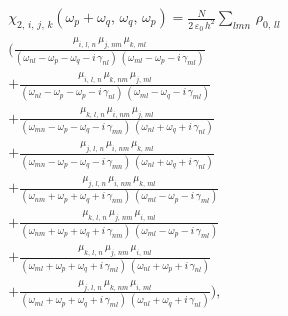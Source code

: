 \documentclass[12pt,twoside,a4paper]{article}
\numberwithin{equation}{subsection}
\numberwithin{figure}{subsection}
\begin{document}
\begin{equation} \label{eq:ssmods_quadratical}
  \begin{split}
    & {\chi_{2, \,i, \,j, \,k}}({\omega_{p}} + {\omega_{q}}, \,{\omega_{q}}, \,{\omega_{p}}) 
      = \frac{N} {2 \, {\varepsilon_0} \, h^{2}} 
        \sum_{lmn} \, {\rho_{0, \,ll}} \, 
 \\ & ( \frac {{\mu_{i, \,l, \,n}} \, {\mu_{j, \,nm}} \, {\mu_{k, \,ml}}} 
              {({\omega_{nl}} - {\omega_{p}} - {\omega_{q}} - i\,{\gamma_{nl}}) \,
               ({\omega_{ml}} - {\omega_{p}} - i\,{\gamma_{ml}}) } 
 \\ & + \frac {{\mu_{i, \,l, \,n}}\,{\mu_{k, \,nm}}\,{\mu_{j, \,ml}}}
              {({\omega_{nl}} - {\omega_{p}} - {\omega_{p}} - i\,{\gamma_{nl}}) \,
               ({\omega_{ml}} - {\omega_{q}} - i\,{\gamma_{ml}})} 
 \\ & + \frac {{\mu_{k, \,l, \,n}}\,{\mu_{i, \,nm}}\,{\mu_{j,\,ml}}}
              {({\omega_{mn}} - {\omega_{p}} - {\omega_{q}} - i\,{\gamma_{mn}}) \,
               ({\omega_{nl}} + {\omega_{q}} + i\,{\gamma_{nl}})}
 \\ & + \frac {{\mu_{j, \,l, \,n}}\,{\mu_{i, \,nm}}\,{\mu_{k, \,ml}}}
              {({\omega_{mn}} - {\omega_{p}} - {\omega_{q}} - i\,{\gamma_{mn}}) \,
               ({\omega_{nl}} + {\omega_{q}} + i\,{\gamma_{nl}})}
 \\ & + \frac {{\mu_{j, \,l, \,n}}\,{\mu_{i, \,nm}}\,{\mu_{k,\,ml}}}
              {({\omega_{nm}} + {\omega_{p}} + {\omega_{q}} + i\,{\gamma_{nm}}) \,
               ({\omega_{ml}} - {\omega_{p}} - i\,{\gamma_{ml}})}
 \\ & + \frac {{\mu_{k, \,l, \,n}}\,{\mu_{j, \,nm}}\,{\mu_{i, \,ml}}}
              {({\omega_{nm}} + {\omega_{p}} + {\omega_{q}} + i\,{\gamma_{nm}}) \,
               ({\omega_{ml}} - {\omega_{p}} - i\,{\gamma_{ml}})} 
 \\ & + \frac {{\mu_{k, \,l, \,n}}\,{\mu_{j, \,nm}}\,{\mu_{i, \,ml}}}
              {({\omega_{ml}} + {\omega_{p}} + {\omega_{q}} + i\,{\gamma_{ml}}) \,
               ({\omega_{nl}} + {\omega_{p}} + i\,{\gamma_{nl}})}
 \\ & + \frac {{\mu_{j, \,l, \,n}}\,{\mu_{k, \,nm}}\,{\mu_{i, \,ml}}}
              {({\omega_{ml}} + {\omega_{p}} + {\omega_{q}} + i\,{\gamma_{ml}}) \,
               ({\omega_{nl}} + {\omega_{q}} + i\,{\gamma_{nl}})} ),
  \end{split}
\end{equation}
\end{document}
